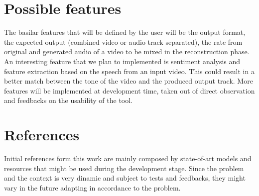 \documentclass[conference]{IEEEtran}
\begin{document}
\section{Possible features}
The basilar features that will be defined by the user will be the output format, the expected output (combined video or audio track separated), the rate from original and generated audio of a video to be mixed in the reconstruction phase.
An interesting feature that we plan to implemented is sentiment analysis and feature extraction based on the speech from an input video.
This could result in a better match between the tone of the video and the produced output track.
More features will be implemented at development time, taken out of direct observation and feedbacks on the usability of the tool.

\section*{References}

Initial references form this work are mainly composed by state-of-art models and resources that might be used during the development stage. Since the problem and the context is very dinamic and subject to tests and feedbacks, they might vary in the future adapting in accordance to the problem. 
\end{document}
